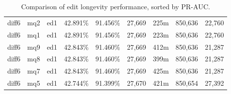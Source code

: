 \begin{sidewaystable}[!ph]
\begin{center}
\begin{tabular}{|c|c|c||c|c||c|c|c|c|}
diff6 & mq2 & ed1 & 42.891\% & 91.456\% & 27,669 & 225m & 850,636 & 22,760 \\
diff6 & mq1 & ed1 & 42.891\% & 91.456\% & 27,669 & 223m & 850,636 & 22,760 \\
diff6 & mq9 & ed1 & 42.843\% & 91.460\% & 27,669 & 412m & 850,636 & 21,287 \\
diff6 & mq8 & ed1 & 42.843\% & 91.460\% & 27,669 & 399m & 850,636 & 21,287 \\
diff6 & mq7 & ed1 & 42.843\% & 91.460\% & 27,669 & 425m & 850,636 & 21,287 \\
diff6 & mq5 & ed1 & 42.744\% & 91.399\% & 27,670 & 421m & 850,654 & 27,392 \\
\hline
\end{tabular}
\end{center}
\caption{Comparison of edit longevity performance,
    sorted by PR-AUC.}
\label{tab:editshoutD}
\end{sidewaystable}
\clearpage
